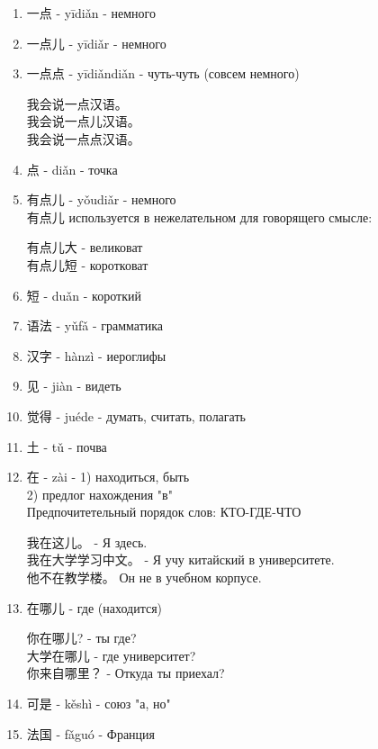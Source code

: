 \begin{newwords}\hfill
	\begin{enumerate}
		\item 一点 - yīdiǎn - немного
		\item 一点儿 - yīdiǎr - немного
		\item 一点点 - yīdiǎndiǎn - чуть-чуть (совсем немного)
		\begin{example}\hfill\break
			我会说一点汉语。\\
			我会说一点儿汉语。\\
			我会说一点点汉语。
		\end{example}
		\item 点 - diǎn - точка
		\item 有点儿 - yǒudiǎr - немного\\
		有点儿 используется в нежелательном для говорящего смысле:
		\begin{example}\hfill\break
			有点儿大 - великоват\\
			有点儿短 - коротковат
		\end{example}
		\item 短 - duǎn - короткий
		\item 语法 - yǔfǎ - грамматика
		\item 汉字 - hànzì - иероглифы
		\item 见 - jiàn - видеть
		\item 觉得 - juéde - думать, считать, полагать
		\item 土 - tǔ - почва
		\item 在 - zài - 1) находиться, быть\\
		2) предлог нахождения "в"\\
		Предпочитетельный порядок слов: КТО-ГДЕ-ЧТО
		\begin{example}\hfill\break
			我在这儿。 - Я здесь.\\
			我在大学学习中文。 - Я учу китайский в университете.\\
			他不在教学楼。 Он не в учебном корпусе.
		\end{example}
		\item 在哪儿 - где (находится)
		\begin{example}\hfill\break
			你在哪儿? - ты где?\\
			大学在哪儿 - где университет?\\
			你来自哪里？ - Откуда ты приехал?
		\end{example}
		\item 可是 - kěshì - союз "а, но"
		\item 法国 - fǎguó - Франция

\end{enumerate}
\end{newwords}
